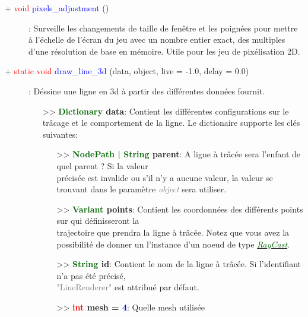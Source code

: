 \documentclass[a4paper, 11pt]{article}
\begin{document}
	\begin{description}
		\item [+ \textcolor{red}{void} \textcolor{blue}{pixels\_adjustment} ()]: Surveille les changements 
		de taille de fenêtre et les poignées pour mettre à l'échelle de l'écran du jeu avec un nombre entier 
		exact, des multiples d'une résolution de base en mémoire. Utile pour les jeu de pixélisation 2D.\\
	\end{description}
	\begin{description}
		\item [+ \textcolor{red}{static void} \textcolor{blue}{draw\_line\_3d} (data, object, live = -1.0, 
		delay = 0.0)]: Déssine une ligne en 3d à partir des différentes données fournit.
		\begin{itemize}
			\item[>> \textbf{\textcolor{darkgreen}{Dictionary} data}:] Contient les différentes 
			configurations sur le trâcage et le comportement de la ligne. Le dictionaire supporte les clés 
			suivantes:
			\begin{itemize}
				\item[>> \textbf{\textcolor{darkgreen}{NodePath | String} parent}:] A ligne à trâcée sera
				l'enfant de quel parent ? Si la valeur \\précisée est invalide ou s'il n'y a aucune valeur,
				la valeur se trouvant dans le paramètre \textit{\textcolor{gray}{object}} sera utiliser.\\
				\item[>> \textbf{\textcolor{darkgreen}{Variant} points}:] Contient les coordonnées des 
				différents points sur qui définisseront la \\trajectoire que prendra la ligne à trâcée.
				Notez que vous avez la possibilité de donner un l'instance d'un noeud de type
				\href{https://docs.godotengine.org/en/stable/classes/class_raycast.html}
				{\textit{\textcolor{darkgreen}{RayCast}}}.\\
				\item[>> \textbf{\textcolor{darkgreen}{String} id}:] Contient le nom de la ligne à trâcée.
				Si l'identifiant n'a pas été précisé, \textcolor{gray}{\\"LineRenderer"} est attribué par
				défaut.\\
				\item[>> \textbf{\textcolor{red}{int} mesh = \textcolor{blue}{4}}:] Quelle mesh utilisée 

\end{itemize}
\end{itemize}
\end{description}
\end{document}
